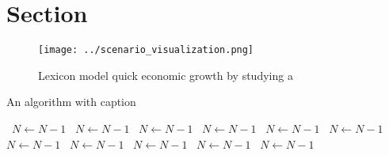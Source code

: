 \documentclass[a4paper]{article}
\begin{document}
\section{Section}

\begin{figure}
\centering
\texttt{[image: ../scenario\_visualization.png]}
\caption{Lexicon model quick economic growth by studying a
}
\end{figure}
 
\begin{algorithm}
\caption{An algorithm with caption}
\begin{algorithmic}
\    \State $N \gets N - 1$
\    \State $N \gets N - 1$
\    \State $N \gets N - 1$
\    \State $N \gets N - 1$
\    \State $N \gets N - 1$
\    \State $N \gets N - 1$
\    \State $N \gets N - 1$
\    \State $N \gets N - 1$
\    \State $N \gets N - 1$
\    \State $N \gets N - 1$
\    \State $N \gets N - 1$
\EndWhile
\end{algorithmic}
\end{algorithm}
\end{document}
